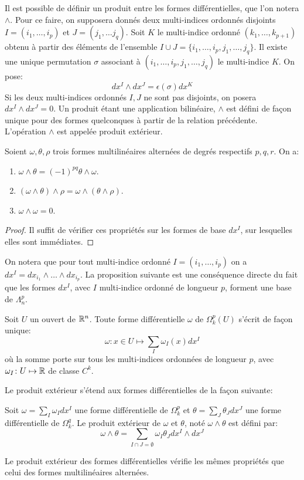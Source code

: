 Il est possible de définir un produit entre les formes différentielles, que l'on notera $\wedge$. 
Pour ce faire, on supposera donnés  deux multi-indices ordonnés disjoints $I=(i_1, \dots , i_p)$ et $J=(j_1, \dots j_q)$. Soit $K$ le multi-indice ordonné  $(k_1,\dots,k_{p+1})$ obtenu à partir des éléments de l'ensemble $I\cup J = \{i_1,\dots,i_p,j_1,\dots,j_q\}$. 
Il existe une unique permutation $\sigma$ associant à $(i_1,\dots,i_p,j_1,\dots,j_q)$ le multi-indice $K$. On pose:
\[
dx^I \wedge dx^J = \epsilon(\sigma) dx^K
\]
Si les deux multi-indices ordonnés $I,J$ ne sont pas disjoints, on posera $dx^I \wedge dx^J = 0$.
Un produit étant une application bilinéaire, $\wedge$ est défini de façon unique pour des formes quelconques à partir de la relation précédente. L'opération $\wedge$ est appelée produit extérieur. 
\begin{fprop}
Soient $\omega,\theta,\rho$ trois formes multilinéaires alternées de degrés respectifs $p,q,r$. On a:
\begin{enumerate}
\item $\omega \wedge \theta = (-1)^{pq} \theta \wedge \omega$.
\item $(\omega \wedge \theta) \wedge \rho = \omega \wedge (\theta \wedge \rho)$.
\item $\omega \wedge \omega = 0$.
\end{enumerate}
\end{fprop}
\begin{proof}
Il suffit de vérifier ces propriétés sur les formes de base $dx^I$, sur lesquelles elles sont immédiates.
\end{proof}
On notera que pour tout multi-indice ordonné $I=(i_1,\dots,i_p)$ on a $dx^I = dx_{i_1}\wedge \dots \wedge dx_{i_p}$.
La proposition suivante est une conséquence directe du fait que les formes $dx^I$, avec $I$ multi-indice ordonné de longueur $p$, forment une base de $\Lambda_n^p$.
\begin{fprop}
Soit $U$ un ouvert de $\mathbb{R}^n$. Toute forme différentielle $\omega$ de $\Omega_k^p(U)$ s'écrit de façon unique:
\[
\omega \colon x \in U \mapsto \sum_I \omega_I(x) dx^I
\]
où la somme porte sur tous les multi-indices ordonnées de longueur $p$, avec $\omega_I \colon U  \mapsto \mathbb{R}$ de classe $C^k$.
\end{fprop}
Le produit extérieur s'étend aux formes différentielles de la façon suivante:
\begin{fdefn}
Soit $\omega = \sum_I \omega_I dx^I$ une forme différentielle de $\Omega_k^p$ et $\theta = \sum_J \theta_J dx^J$ une forme différentielle de $\Omega_k^q$. Le produit extérieur de $\omega$ et $\theta$, noté $\omega \wedge \theta$ est défini par:
\[
\omega \wedge \theta = \sum_{I\cap J = \emptyset} \omega_I \theta_J dx^I \wedge dx^J 
\]
\end{fdefn}
Le produit extérieur des formes différentielles vérifie les mêmes propriétés que celui des formes multilinéaires alternées. 

